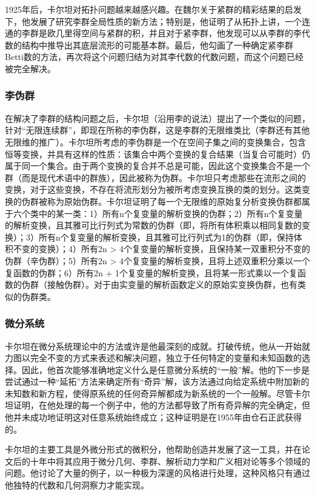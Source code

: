 1925年后，卡尔坦对拓扑问题越来越感兴趣。在魏尔关于紧群的精彩结果的启发下，他发展了研究李群全局性质的新方法；特别是，他证明了从拓扑上讲，一个连通的李群是欧几里得空间与紧群的积，并且对于紧李群，他发现可以从李群的李代数的结构中推导出其底层流形的可能基本群。最后，他勾画了一种确定紧李群Betti数的方法，再次将这个问题归结为对其李代数的代数问题，而这个问题已经被完全解决。
\subsubsection{李伪群}  
在解决了李群的结构问题之后，卡尔坦（沿用李的说法）提出了一个类似的问题，针对“无限连续群”，即现在所称的李伪群，这是李群的无限维类比（李群还有其他无限维的推广）。卡尔坦所考虑的李伪群是一个在空间子集之间的变换集合，包含恒等变换，并具有这样的性质：该集合中两个变换的复合结果（当复合可能时）仍属于同一个集合。由于两个变换的复合并不总是可能，因此这个变换集合不是一个群（而是现代术语中的群族），因此被称为伪群。卡尔坦只考虑那些在流形之间的变换，对于这些变换，不存在将流形划分为被所考虑变换互换的类的划分。这类变换的伪群被称为原始伪群。卡尔坦证明了每一个无限维的原始复分析变换伪群都属于六个类中的某一类：1）所有n个复变量的解析变换的伪群；2）所有n个复变量的解析变换，且其雅可比行列式为常数的伪群（即，将所有体积乘以相同复数的变换）；3）所有n个复变量的解析变换，且其雅可比行列式为1的伪群（即，保持体积不变的变换）；4）所有2n > 4个复变量的解析变换，且保持某一双重积分不变的伪群（辛伪群）；5）所有2n > 4个复变量的解析变换，且将上述双重积分乘以一个复函数的伪群；6）所有2n + 1个复变量的解析变换，且将某一形式乘以一个复函数的伪群（接触伪群）。对于由实变量的解析函数定义的原始实变换伪群，也有类似的伪群类。
\subsubsection{微分系统}  
卡尔坦在微分系统理论中的方法或许是他最深刻的成就。打破传统，他从一开始就力图以完全不变的方式来表述和解决问题，独立于任何特定的变量和未知函数的选择。因此，他首次能够准确地定义什么是任意微分系统的“一般”解。他的下一步是尝试通过一种“延拓”方法来确定所有“奇异”解，该方法通过向给定系统中附加新的未知数和新方程，使得原系统的任何奇异解都成为新系统的一个一般解。尽管卡尔坦证明，在他处理的每一个例子中，他的方法都导致了所有奇异解的完全确定，但他并未成功地证明这对任意系统始终成立；这种证明是在1955年由仓石正武获得的。

卡尔坦的主要工具是外微分形式的微积分，他帮助创造并发展了这一工具，并在论文后的十年中将其应用于微分几何、李群、解析动力学和广义相对论等多个领域的问题。他讨论了大量的例子，以一种极为深邃的风格进行处理，这种风格只有通过他独特的代数和几何洞察力才能实现。
